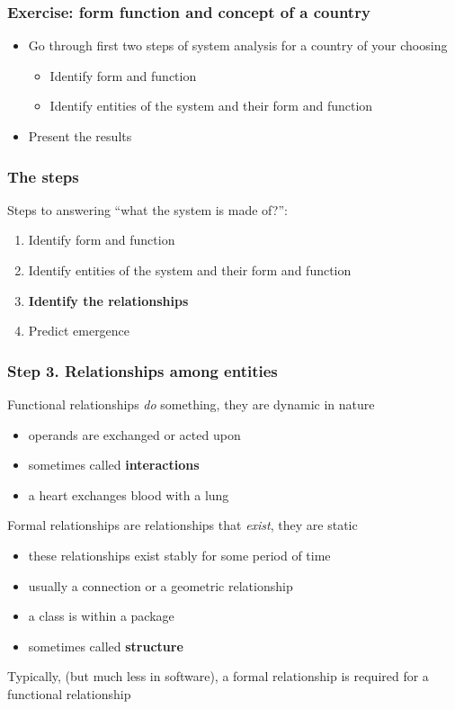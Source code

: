 \documentclass[10pt, compress]{beamer}
\begin{document}
\begin{frame}[fragile]
  \frametitle{Exercise: form function and concept of a country}
  	\begin{itemize}
		\item Go through first two steps of system analysis for a country of your choosing
		\begin{itemize}
			\item Identify form and function
			\item Identify entities of the system and their form and function
		\end{itemize}
		\item Present the results
	\end{itemize}
\end{frame}


\begin{frame}[fragile]
  \frametitle{The steps}
	Steps to answering \enquote{what the system is made of?}:
		\begin{enumerate}
			\item Identify form and function
			\item Identify entities of the system and their form and function
			\item \textbf{Identify the relationships}
			\item Predict emergence
		\end{enumerate}
		
\end{frame}

\begin{frame}
	\frametitle{Step 3. Relationships among entities}
	Functional relationships \emph{do} something, they are dynamic in nature
	\begin{itemize}
		\item operands are exchanged or acted upon
		\item sometimes called \textbf{interactions}
		\item a heart exchanges blood with a lung
	\end{itemize}
	Formal relationships are relationships that \emph{exist}, they are static
	\begin{itemize}
		\item these relationships exist stably for some period of time
		\item usually a connection or a geometric relationship
		\item a class is within a package
		\item sometimes called \textbf{structure}
	\end{itemize}
	
	Typically, (but much less in software), a formal relationship is required for a functional relationship
\end{frame}
\end{document}
